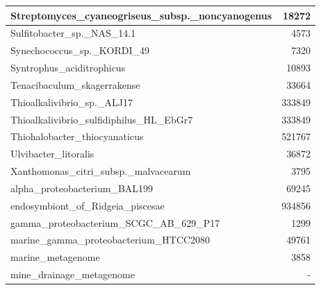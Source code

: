 \documentclass[12pt,a4paper]{article}
\begin{document}
\begin{table}[ht]
\begin{center}
\begin{tabular}{|l*{1}{|r}|}
Streptomyces\_cyaneogriseus\_subsp.\_noncyanogenus & 18272 \\ \hline
Sulfitobacter\_sp.\_NAS\_14.1 & 4573 \\ \hline
Synechococcus\_sp.\_KORDI\_49 & 7320 \\ \hline
Syntrophus\_aciditrophicus & 10893 \\ \hline
Tenacibaculum\_skagerrakense & 33664 \\ \hline
Thioalkalivibrio\_sp.\_ALJ17 & 333849 \\ \hline
Thioalkalivibrio\_sulfidiphilus\_HL\_EbGr7 & 333849 \\ \hline
Thiohalobacter\_thiocyanaticus & 521767 \\ \hline
Ulvibacter\_litoralis & 36872 \\ \hline
Xanthomonas\_citri\_subsp.\_malvacearum & 3795 \\ \hline
alpha\_proteobacterium\_BAL199 & 69245 \\ \hline
endosymbiont\_of\_Ridgeia\_piscesae & 934856 \\ \hline
gamma\_proteobacterium\_SCGC\_AB\_629\_P17 & 1299 \\ \hline
marine\_gamma\_proteobacterium\_HTCC2080 & 49761 \\ \hline
marine\_metagenome & 3858 \\ \hline
mine\_drainage\_metagenome & - \\ \hline
\end{tabular}
\end{center}
\end{table}
\end{document}
